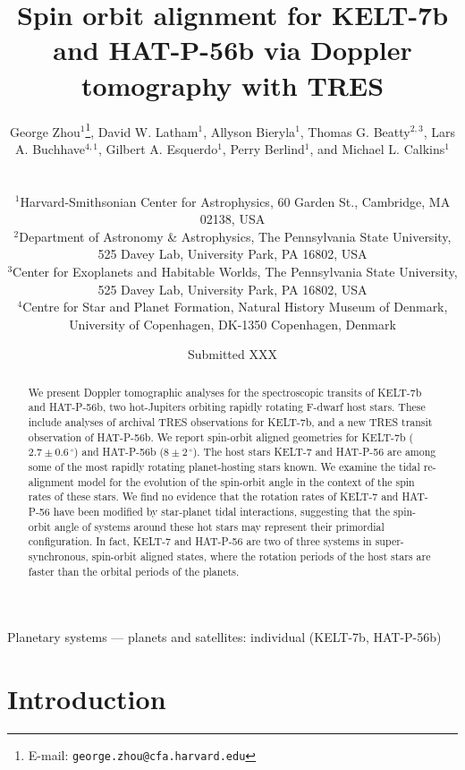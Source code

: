 \documentclass[useAMS,usenatbib]{mn2e}
\title[Doppler tomography with TRES]{Spin orbit alignment for KELT-7b and HAT-P-56b via Doppler tomography with TRES}
\author[G.~Zhou et al.]
{\parbox{\textwidth}
  {George Zhou$^{1}$\thanks{E-mail: \texttt{george.zhou@cfa.harvard.edu}},
    David W. Latham$^{1}$,
    Allyson Bieryla$^{1}$,
    Thomas G. Beatty$^{2,3}$,
    Lars A. Buchhave$^{4,1}$,
    Gilbert A. Esquerdo$^{1}$,
    Perry Berlind$^{1}$,
    and Michael L. Calkins$^{1}$
\vspace{0.4cm}}\\
\parbox{\textwidth}{
  $^{1}${Harvard-Smithsonian Center for Astrophysics, 60 Garden St., Cambridge, MA 02138, USA}\\
  $^{2}${Department of Astronomy \& Astrophysics, The Pennsylvania State University, 525 Davey Lab, University Park, PA 16802, USA}\\
  $^{3}${Center for Exoplanets and Habitable Worlds, The Pennsylvania State University, 525 Davey Lab, University Park, PA 16802, USA}\\
  $^{4}${Centre for Star and Planet Formation, Natural History Museum of Denmark, University of Copenhagen, DK-1350 Copenhagen, Denmark}\\
}}
\begin{document}

\date{Submitted XXX}

\pagerange{\pageref{firstpage}--\pageref{lastpage}} 

\maketitle

\label{firstpage}

\begin{abstract}
We present Doppler tomographic analyses for the spectroscopic transits of KELT-7b and HAT-P-56b, two hot-Jupiters orbiting rapidly rotating F-dwarf host stars. These include analyses of archival TRES observations for KELT-7b, and a new TRES transit observation of HAT-P-56b. We report spin-orbit aligned geometries for KELT-7b ($2.7 \pm 0.6\,^\circ$) and HAT-P-56b ($8 \pm 2\,^\circ$). The host stars KELT-7 and HAT-P-56 are among some of the most rapidly rotating planet-hosting stars known. We examine the tidal re-alignment model for the evolution of the spin-orbit angle in the context of the spin rates of these stars. We find no evidence that the rotation rates of KELT-7 and HAT-P-56 have been modified by star-planet tidal interactions, suggesting that the spin-orbit angle of systems around these hot stars may represent their primordial configuration. In fact, KELT-7 and HAT-P-56 are two of three systems in super-synchronous, spin-orbit aligned states, where the rotation periods of the host stars are faster than the orbital periods of the planets.
\end{abstract}

\begin{keywords}
Planetary systems — planets and satellites: individual (KELT-7b, HAT-P-56b)
\end{keywords}


\section{Introduction}
\label{sec:introduction}
\end{document}
